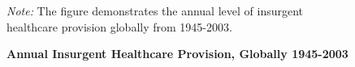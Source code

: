 \documentclass[12pt, letterpaper]{article}
\begin{document}
\newpage
\begin{center}
\begin{figure}[h!]
\renewcommand\thefigure{A.\arabic{figure}}
\begin{center}
\caption{\textbf{Annual Insurgent Healthcare Provision, Globally 1945-2003}}
\label{figure:insurgenthealthannual}
\end{center}
\begin{tablenotes}
\raggedright \footnotesize{\textit{Note:} \footnotesize The figure demonstrates the annual level of insurgent healthcare provision globally from 1945-2003.} 
\end{tablenotes}
\end{figure}
\end{center}




\end{document}
